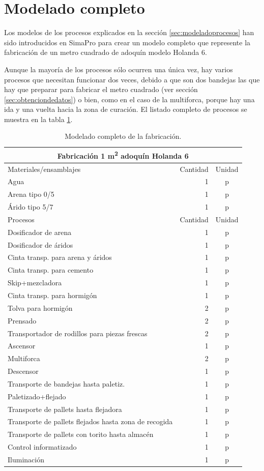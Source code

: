 \section{Modelado completo}

Los modelos de los procesos explicados en la sección \ref{sec:modeladoprocesos} han sido introducidos en SimaPro para crear un modelo completo que represente la fabricación de un metro cuadrado de adoquín modelo Holanda 6.

Aunque la mayoría de los procesos sólo ocurren una única vez, hay varios procesos que necesitan funcionar dos veces, debido a que son dos bandejas las que hay que preparar para fabricar el metro cuadrado (ver sección \ref{sec:obtenciondedatos}) o bien, como en el caso de la multiforca, porque hay una ida y una vuelta hacia la zona de curación. El listado completo de procesos se muestra en la tabla \ref{modeladocompleto}.

\begin{table}[!htp]
\centering
\begin{tabular}{p{8cm}rc}
\toprule
\multicolumn{3}{c}{Fabricación 1 \si{m^2} adoquín Holanda 6}\\
\midrule
Materiales/ensamblajes & Cantidad & Unidad\\
\midrule
Agua & 1 & p\\
Arena tipo 0/5 & 1 & p\\
Árido tipo 5/7 & 1 & p\\
\midrule
Procesos & Cantidad & Unidad\\
\midrule
Dosificador de arena & 1 & p\\
Dosificador de áridos & 1 & p\\
Cinta transp. para arena y áridos & 1 & p\\
Cinta transp. para cemento & 1 & p\\
Skip+mezcladora & 1 & p\\
Cinta transp. para hormigón & 1 & p\\
Tolva para hormigón & 2 & p\\
Prensado & 2 & p\\
Transportador de rodillos para piezas frescas & 2 & p\\
Ascensor & 1 & p\\
Multiforca & 2 & p\\
Descensor & 1 & p\\
Transporte de bandejas hasta paletiz. & 1 & p\\
Paletizado+flejado & 1 & p\\
Transporte de pallets hasta flejadora & 1 & p\\
Transporte de pallets flejados hasta zona de recogida & 1 & p\\
Transporte de pallets con torito hasta almacén & 1 & p\\
Control informatizado & 1 & p\\
Iluminación & 1 & p\\
\bottomrule
\end{tabular}
\caption{Modelado completo de la fabricación.}
\label{modeladocompleto}
\end{table}

